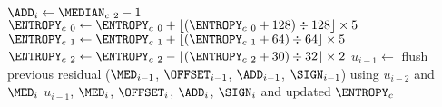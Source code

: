 {{  $\text{\ADD}_i \leftarrow \text{\MEDIAN}_{c~2} - 1$\;
  $\text{\ENTROPY}_{c~0} \leftarrow \text{\ENTROPY}_{c~0} + \lfloor(\text{\ENTROPY}_{c~0} + 128) \div 128\rfloor \times 5$\;
  $\text{\ENTROPY}_{c~1} \leftarrow \text{\ENTROPY}_{c~1} + \lfloor(\text{\ENTROPY}_{c~1} + 64) \div 64\rfloor \times 5$\;
  $\text{\ENTROPY}_{c~2} \leftarrow \text{\ENTROPY}_{c~2} - \lfloor(\text{\ENTROPY}_{c~2} + 30) \div 32\rfloor \times 2$\;
}
$u_{i - 1} \leftarrow$ flush previous residual ($\text{\MED}_{i - 1}$, $\text{\OFFSET}_{i - 1}$, $\text{\ADD}_{i - 1}$, $\text{\SIGN}_{i - 1}$) using $u_{i - 2}$ and $\text{\MED}_i$\;
\Return $u_{i - 1}$, $\text{\MED}_i$, $\text{\OFFSET}_i$, $\text{\ADD}_i$, $\text{\SIGN}_i$ and updated $\text{\ENTROPY}_c$\;
\EALGORITHM
}

\clearpage

